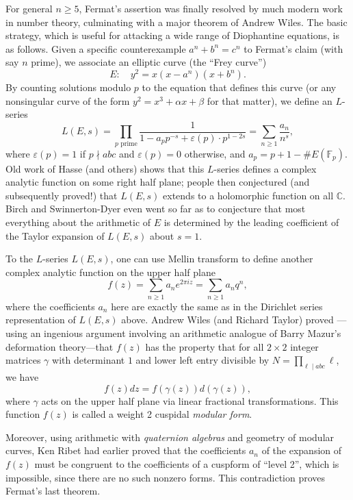 \documentclass{book}
\theoremstyle{plain}
\theoremstyle{definition}
\numberwithin{equation}{section}
\numberwithin{figure}{section}
\numberwithin{table}{section}
\newcommand{\C}{\mathbb{C}}
\newcommand{\F}{\mathbb{F}}
\begin{document}
For general $n\geq 5$, Fermat's assertion was finally resolved by much modern
work in number theory, culminating with a major theorem of
Andrew Wiles.  The basic strategy, which is useful for
attacking a wide range of Diophantine equations, is as follows.
Given a specific counterexample
$a^n + b^n = c^n$ to Fermat's claim (with say $n$ prime), we associate
an elliptic curve (the ``Frey curve'')
$$
  E: \quad y^2 = x(x-a^n)(x+b^n).
$$
By counting solutions modulo $p$ to the equation that defines this curve (or
any nonsingular curve of the form $y^2=x^3+\alpha x + \beta$ for that matter),
we define an $L$-series
$$
L(E,s) =
\prod_{p \text{ prime}} \frac{1}{1-a_p p^{-s} + \varepsilon(p)\cdot p^{1-2s}}
 = \sum_{n\geq 1} \frac{a_n}{n^s},
$$
where $\varepsilon(p)=1$ if $p\nmid abc$ and $\varepsilon(p)=0$ otherwise,
and $a_p = p+1-\#E(\F_p)$.
Old work of Hasse (and others)
shows that this $L$-series defines a complex analytic
function on some right half plane; people then conjectured (and
subsequently proved!)
that $L(E,s)$ extends to a holomorphic function on all $\C$.
Birch and Swinnerton-Dyer even went so far as to conjecture
that most everything about the arithmetic of $E$
is determined by the leading coefficient of the
Taylor expansion of $L(E,s)$ about $s=1$.

To the $L$-series $L(E,s)$, one can use
Mellin transform to define another complex analytic function
on the upper half plane
$$
f(z) = \sum_{n\geq 1} a_n e^{2\pi i z} = \sum_{n\geq 1} a_n q^n,
$$
where the coefficients $a_n$ here are exactly the same as
in the Dirichlet series representation of $L(E,s)$ above.
Andrew Wiles (and Richard Taylor) proved \cite{wiles:fermat}---using
an ingenious
argument involving an arithmetic analogue of Barry Mazur's
deformation theory---that
$f(z)$ has the property that for
all $2\times 2$ integer matrices
$\gamma$ with determinant $1$ and lower left entry divisible
by $N=\prod_{\ell\mid abc} \ell$, we have
$$
  f(z) dz = f(\gamma(z)) d(\gamma(z)),
$$
where $\gamma$ acts on the upper half plane
via linear fractional transformations.  This function
$f(z)$ is called a weight 2 cuspidal {\em modular form}.

Moreover, using arithmetic with {\em quaternion algebras} and
geometry of modular curves, Ken Ribet had earlier proved that
the coefficients $a_n$ of the expansion of
$f(z)$ must be congruent to the coefficients
of a cuspform of ``level 2'', which is
impossible, since there are no such nonzero forms.
This contradiction proves Fermat's last theorem.
\end{document}
